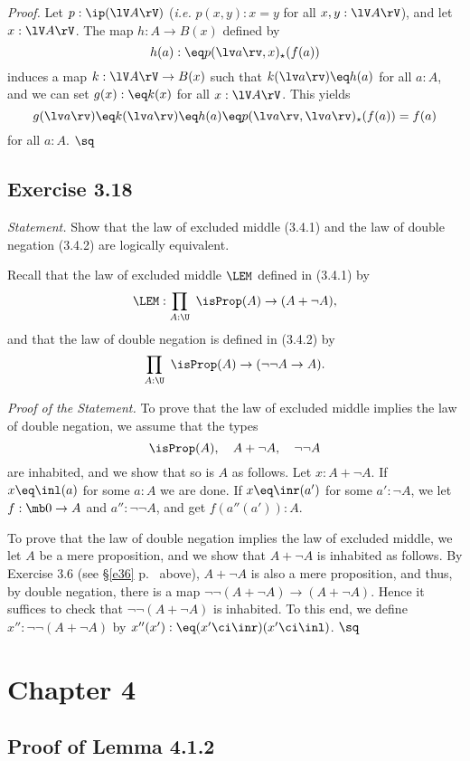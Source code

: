 \documentclass[12pt]{article}
\begin{document}
\nn\emph{Proof.} Let $p:\ip(\lV A\rV)$ (\emph{i.e.} $p(x,y):x=y$ for all $x,y:\lV A\rV$), and let $x:\lV A\rV$. The map $h:A\to B(x)$ defined by 
$$
h(a):\eq p(\lv a\rv,x)_\star(f(a))
$$ 
induces a map $k:\lV A\rV\to B(x)$ such that $k(\lv a\rv)\eq h(a)$ for all $a:A$, and we can set $g(x):\eq k(x)$ for all $x:\lV A\rV$. This yields 
$$
g(\lv a\rv)\eq k(\lv a\rv)\eq h(a)\eq p(\lv a\rv,\lv a\rv)_\star(f(a))=f(a)
$$ 
for all $a:A$. $\sq$


\subsection{Exercise 3.18}

\emph{Statement.} Show that the law of excluded middle (3.4.1) and the law of double negation (3.4.2) are logically equivalent.

Recall that the law of excluded middle $\LEM$ defined in (3.4.1) by 
$$
\LEM:\prod_{A:\U}\ \isProp(A)\to(A+\neg A),
$$ 
and that the law of double negation is defined in (3.4.2) by 
$$
\prod_{A:\U}\ \isProp(A)\to(\neg\neg A\to A).
$$ 

\nn\emph{Proof of the Statement.} To prove that the law of excluded middle implies the law of double negation, we assume that the types 
$$
\isProp(A),\quad A+\neg A,\quad \neg\neg A
$$ 
are inhabited, and we show that so is $A$ as follows. Let $x:A+\neg A$. If $x\eq\inl(a)$ for some $a:A$ we are done. If $x\eq\inr(a')$ for some $a':\neg A$, we let $f:\mb0\to A$ and $a'':\neg\neg A$, and get $f(a''(a')):A$. 

To prove that the law of double negation implies the law of excluded middle, we let $A$ be a mere proposition, and we show that $A+\neg A$ is inhabited as follows. By Exercise 3.6 (see \S\ref{e36} p.~\pageref{e36} above), $A+\neg A$ is also a mere proposition, and thus, by double negation, there is a map $\neg\neg(A+\neg A)\to(A+\neg A)$. Hence it suffices to check that $\neg\neg(A+\neg A)$ is inhabited. To this end, we define $x'':\neg\neg(A+\neg A)$ by $x''(x'):\eq(x'\ci\inr)(x'\ci\inl)$. $\sq$


\section{Chapter 4}

\subsection{Proof of Lemma 4.1.2}
\end{document}
